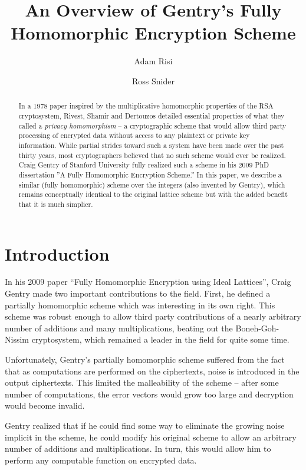 \documentclass[a4paper,10pt]{article}
\title{An Overview of Gentry's Fully Homomorphic Encryption Scheme}
\author{Adam Risi \and Ross Snider}
\begin{document}
\maketitle
\titlepage
\tableofcontents
\pagebreak

\begin{abstract}
  In a 1978 paper\cite{rad-priv} inspired by the multiplicative
  homomorphic properties of the RSA cryptosystem, Rivest, Shamir and
  Dertouzos detailed essential properties of what they called a
  \textit{privacy homomorphism} -- a cryptographic scheme that would
  allow third party processing of encrypted data without access to any
  plaintext or private key information. While partial strides toward
  such a system have been made over the past thirty years, most
  cryptographers believed that no such scheme would ever be
  realized. Craig Gentry of Stanford University fully realized such a
  scheme in his 2009 PhD dissertation ''A Fully Homomorphic Encryption
  Scheme.''\cite{gentry-thesis} In this paper, we describe a similar
  (fully homomorphic) scheme over the integers (also invented by
  Gentry)\cite{gentry-integer}, which remains conceptually identical
  to the original lattice scheme but with the added benefit that it is
  much simplier.
\end{abstract}

\section{Introduction}
In his 2009 paper ``Fully Homomorphic Encryption using Ideal
Lattices''\cite{gentry-lattice}, Craig Gentry made two important
contributions to the field. First, he defined a partially homomorphic
scheme which was interesting in its own right. This scheme was robust
enough to allow third party contributions of a nearly arbitrary number
of additions and many multiplications, beating out the
Boneh-Goh-Nissim cryptosystem, which remained a leader in the field
for quite some time.

Unfortunately, Gentry's partially homomorphic scheme suffered from the
fact that as computations are performed on the ciphertexts, noise is
introduced in the output ciphertexts. This limited the malleability of
the scheme -- after some number of computations, the error vectors
would grow too large and decryption would become invalid.

Gentry realized that if he could find some way to eliminate the
growing noise implicit in the scheme, he could modify his original
scheme to allow an arbitrary number of additions and
multiplications. In turn, this would allow him to perform any
computable function on encrypted data.
\end{document}
